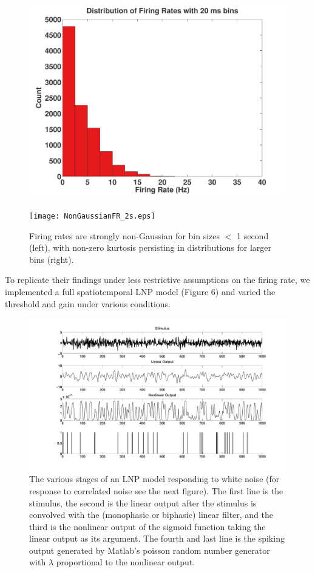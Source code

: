 \documentclass[12pt]{article}
\begin{document}
\begin{figure}[h!!]
\centering
\begin{minipage}[b]{0.45\linewidth}
\centering
\includegraphics[width=\textwidth]{NonGaussianFR.pdf}
\end{minipage}
\begin{minipage}[b]{0.45\linewidth}
\centering
\texttt{[image: NonGaussianFR\_2s.eps]}
\end{minipage}
\caption{Firing rates are strongly non-Gaussian for bin sizes $<$ 1 second (left), with non-zero kurtosis persisting in distributions for larger bins (right).}
\label{Figure 5}
\end{figure}

To replicate their findings under less restrictive assumptions on the firing rate, we implemented a full spatiotemporal LNP model (Figure 6) and varied the threshold and gain under various conditions.

\begin{figure}[h!!]
\includegraphics[width=\textwidth]{lnp_white.pdf}
\caption{The various stages of an LNP model responding to white noise (for response to correlated noise see the next figure).  The first line is the stimulus, the second is the linear output after the stimulus is convolved with the (monophasic or biphasic) linear filter, and the third is the nonlinear output of the sigmoid function taking the linear output as its argument.  The fourth and last line is the spiking output generated by Matlab's poisson random number generator with $\lambda$ proportional to the nonlinear output.}
\label{Figure 6}
\end{figure}
\end{document}
